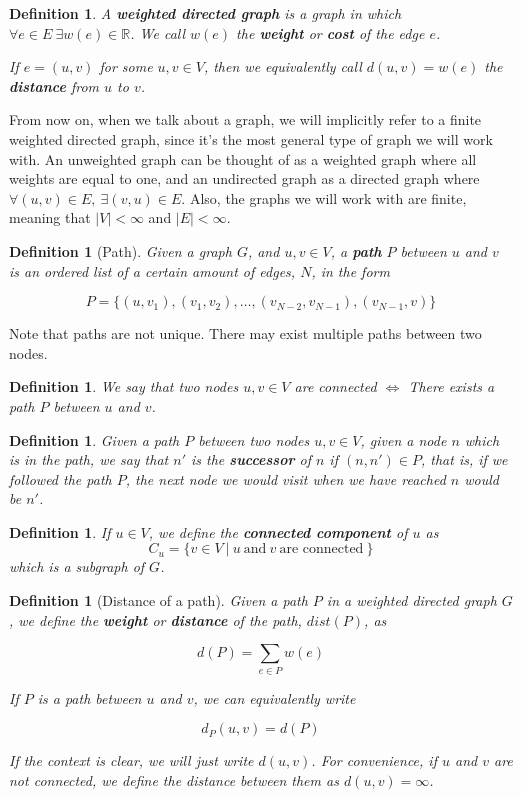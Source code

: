 \documentclass[12pt]{report}
\newtheorem{definition}[theorem]{Definition}
\begin{document}
\begin{definition}
A \textbf{weighted directed graph} is a graph in which $\forall e \in E \ \exists w(e) \in \mathbb{R}$. We call $w(e)$ the \textbf{weight} or \textbf{cost} of the edge $e$.

If $e = (u, v)$ for some $u, v \in V$, then we equivalently call $d(u, v) = w(e)$ the \textbf{distance} from $u$ to $v$.
\end{definition}

From now on, when we talk about a graph, we will implicitly refer to a finite weighted directed graph, since it's the most general type of graph we will work with. An unweighted graph can be thought of as a weighted graph where all weights are equal to one, and an undirected graph as a directed graph where $\forall (u, v) \in E,\  \exists (v, u) \in E$. Also, the graphs we will work with are finite, meaning that $|V| < \infty$ and $|E| < \infty$.

\begin{definition}[Path]
Given a graph $G$, and $u, v \in V$, a \textbf{path} $P$ between $u$ and $v$ is an ordered list of a certain amount of edges, $N$, in the form

\[ P = \{(u,v_1), (v_1, v_2), \dots, (v_{N-2}, v_{N-1}), (v_{N-1}, v)\} \]

\end{definition}

Note that paths are not unique. There may exist multiple paths between two nodes.

\begin{definition}
We say that two nodes $u, v \in V$ are connected $\Longleftrightarrow$ There exists a path $P$ between $u$ and $v$.
\end{definition}

\begin{definition}
Given a path $P$ between two nodes $u, v \in V$, given a node $n$ which is in the path, we say that $n'$ is the \textbf{successor} of $n$ if $(n, n') \in P$, that is, if we followed the path $P$, the next node we would visit when we have reached $n$ would be $n'$.
\end{definition}

\begin{definition}
If $u \in V$, we define the \textbf{connected component} of $u$ as
\[ C_u = \{ v \in V\ |\ u \ \text{and} \ v \ \text{are connected}\  \} \]
which is a subgraph of $G$.
\end{definition}

\begin{definition}[Distance of a path]
Given a path $P$ in a weighted directed graph $G$, we define the \textbf{weight} or \textbf{distance} of the path, $dist(P)$, as

\[ d(P) = \sum_{e \in P} w(e) \]

If $P$ is a path between $u$ and $v$, we can equivalently write

\[ d_P(u, v) = d(P) \]

If the context is clear, we will just write $d(u, v)$. For convenience, if $u$ and $v$ are not connected, we define the distance between them as $d(u, v) = \infty$.
\end{definition}
\end{document}
